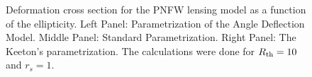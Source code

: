\begin{figure}[!ht]
{}
\caption{\label{dcs_pnfw_e} Deformation cross section for the  PNFW lensing
model as a function of the ellipticity. Left Panel: 
Parametrization of the Angle Deflection Model. Middle Panel: Standard
Parametrization. Right Panel: The Keeton's parametrization. The calculations
were done for $R_{\rm th}=10$ and $r_s=1$.}
\end{figure}

